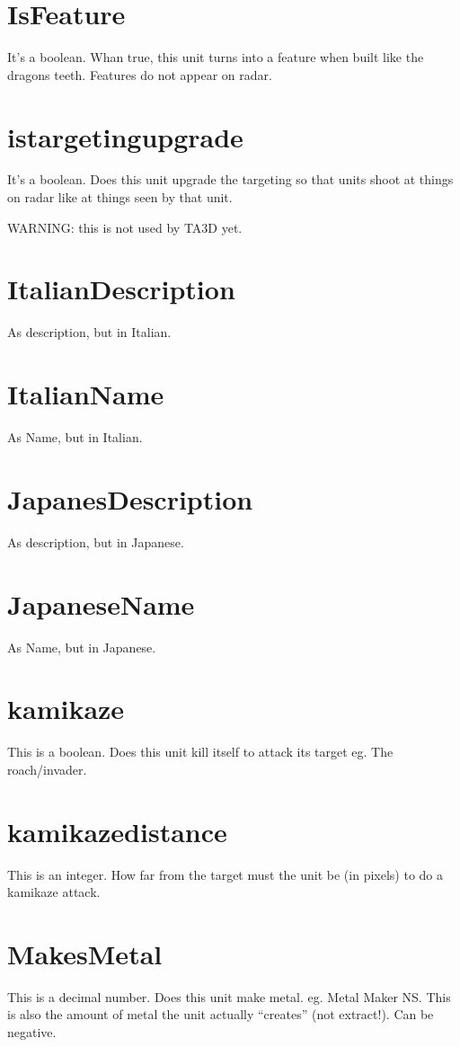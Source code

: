 \documentclass[a4paper,10pt]{article}
\begin{document}
\section{IsFeature}
It's a boolean. Whan true, this unit turns into a feature when built like the dragons teeth. Features do not appear on radar.

\section{istargetingupgrade}
It's a boolean. Does this unit upgrade the targeting so that units shoot at things on radar like at things seen by that unit.

WARNING: this is not used by TA3D yet.

\section{ItalianDescription}
As description, but in Italian.

\section{ItalianName}
As Name, but in Italian.

\section{JapanesDescription}
As description, but in Japanese.

\section{JapaneseName}
As Name, but in Japanese.

\section{kamikaze}
This is a boolean. Does this unit kill itself to attack its target eg. The roach/invader.

\section{kamikazedistance}
This is an integer. How far from the target must the unit be (in pixels) to do a kamikaze attack.

\section{MakesMetal}
This is a decimal number. Does this unit make metal. eg. Metal Maker NS. This is also the amount of metal the unit actually ``creates'' (not extract!). Can be negative.
\end{document}
